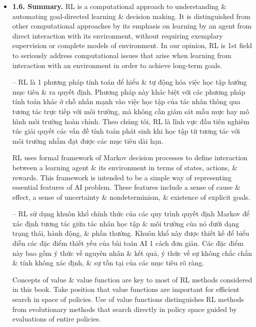 \documentclass{article}
\newtheorem{problem}{Problem}
\begin{document}
\begin{itemize}
\begin{itemize}
\begin{problem}[Other Improvements]
            -- Bạn có thể nghĩ ra cách nào khác để cải thiện trình chơi RL không? Bạn có thể nghĩ ra cách nào tốt hơn để giải bài toán tic-tac-toe như đã nêu không?
        \end{problem}
        \item {\bf1.6. Summary.} RL is a computational approach to understanding \& automating goal-directed learning \& decision making. It is distinguished from other computational approaches by its emphasis on learning by an agent from direct interaction with its environment, without requiring exemplary supervision or complete models of environment. In our opinion, RL is 1st field to seriously address computational issues that arise when learning from interaction with an environment in order to achieve long-term goals.

        -- RL là 1 phương pháp tính toán để hiểu \& tự động hóa việc học tập hướng mục tiêu \& ra quyết định. Phương pháp này khác biệt với các phương pháp tính toán khác ở chỗ nhấn mạnh vào việc học tập của tác nhân thông qua tương tác trực tiếp với môi trường, mà không cần giám sát mẫu mực hay mô hình môi trường hoàn chỉnh. Theo chúng tôi, RL là lĩnh vực đầu tiên nghiêm túc giải quyết các vấn đề tính toán phát sinh khi học tập từ tương tác với môi trường nhằm đạt được các mục tiêu dài hạn.

        RL uses formal framework of Markov decision processes to define interaction between a learning agent \& its environment in terms of states, actions, \& rewards. This framework is intended to be a simple way of representing essential features of AI problem. These features include a sense of cause \& effect, a sense of uncertainty \& nondeterminism, \& existence of explicit goals.

        -- RL sử dụng khuôn khổ chính thức của các quy trình quyết định Markov để xác định tương tác giữa tác nhân học tập \& môi trường của nó dưới dạng trạng thái, hành động, \& phần thưởng. Khuôn khổ này được thiết kế để biểu diễn các đặc điểm thiết yếu của bài toán AI 1 cách đơn giản. Các đặc điểm này bao gồm ý thức về nguyên nhân \& kết quả, ý thức về sự không chắc chắn \& tính không xác định, \& sự tồn tại của các mục tiêu rõ ràng.

        Concepts of value \& value function are key to most of RL methods considered in this book. Take position that value functions are important for efficient search in space of policies. Use of value functions distinguishes RL methods from evolutionary methods that search directly in policy space guided by evaluations of entire policies.


\end{itemize}
\end{itemize}
\end{document}
